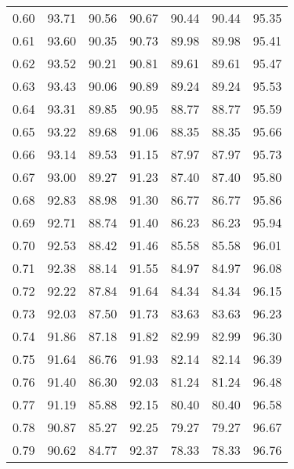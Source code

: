 \begin{tabular}{|c|c|c|c|c|c|c|}
      0.60 &     93.71 &     90.56 &      90.67 &   90.44 &      90.44 &         95.35 \\
      0.61 &     93.60 &     90.35 &      90.73 &   89.98 &      89.98 &         95.41 \\
      0.62 &     93.52 &     90.21 &      90.81 &   89.61 &      89.61 &         95.47 \\
      0.63 &     93.43 &     90.06 &      90.89 &   89.24 &      89.24 &         95.53 \\
      0.64 &     93.31 &     89.85 &      90.95 &   88.77 &      88.77 &         95.59 \\
      0.65 &     93.22 &     89.68 &      91.06 &   88.35 &      88.35 &         95.66 \\
      0.66 &     93.14 &     89.53 &      91.15 &   87.97 &      87.97 &         95.73 \\
      0.67 &     93.00 &     89.27 &      91.23 &   87.40 &      87.40 &         95.80 \\
      0.68 &     92.83 &     88.98 &      91.30 &   86.77 &      86.77 &         95.86 \\
      0.69 &     92.71 &     88.74 &      91.40 &   86.23 &      86.23 &         95.94 \\
      0.70 &     92.53 &     88.42 &      91.46 &   85.58 &      85.58 &         96.01 \\
      0.71 &     92.38 &     88.14 &      91.55 &   84.97 &      84.97 &         96.08 \\
      0.72 &     92.22 &     87.84 &      91.64 &   84.34 &      84.34 &         96.15 \\
      0.73 &     92.03 &     87.50 &      91.73 &   83.63 &      83.63 &         96.23 \\
      0.74 &     91.86 &     87.18 &      91.82 &   82.99 &      82.99 &         96.30 \\
      0.75 &     91.64 &     86.76 &      91.93 &   82.14 &      82.14 &         96.39 \\
      0.76 &     91.40 &     86.30 &      92.03 &   81.24 &      81.24 &         96.48 \\
      0.77 &     91.19 &     85.88 &      92.15 &   80.40 &      80.40 &         96.58 \\
      0.78 &     90.87 &     85.27 &      92.25 &   79.27 &      79.27 &         96.67 \\
      0.79 &     90.62 &     84.77 &      92.37 &   78.33 &      78.33 &         96.76 \\

\end{tabular}
